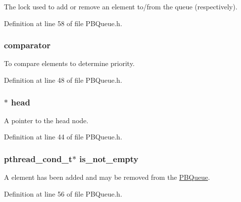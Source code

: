 The lock used to add or remove an element to/from the queue (respectively). 



Definition at line 58 of file P\+B\+Queue.\+h.

\hypertarget{struct_p_b_queue_a0e28f62bf96f811d42068f8d6b76cd47}{}
\subsubsection[{comparator}]{ comparator}\label{struct_p_b_queue_a0e28f62bf96f811d42068f8d6b76cd47}


To compare elements to determine priority. 



Definition at line 48 of file P\+B\+Queue.\+h.

\hypertarget{struct_p_b_queue_ab4aace72deb6ab6ac22137e740a3968b}{}
\subsubsection[{head}]{$\ast$ head}\label{struct_p_b_queue_ab4aace72deb6ab6ac22137e740a3968b}


A pointer to the head node. 



Definition at line 44 of file P\+B\+Queue.\+h.

\hypertarget{struct_p_b_queue_a2de5f9fe801e3f825c62cbad497ac623}{}
\subsubsection[{is\+\_\+not\+\_\+empty}]{\setlength{\rightskip}{0pt plus 5cm}pthread\+\_\+cond\+\_\+t$\ast$ is\+\_\+not\+\_\+empty}\label{struct_p_b_queue_a2de5f9fe801e3f825c62cbad497ac623}


A element has been added and may be removed from the \hyperlink{struct_p_b_queue}{P\+B\+Queue}. 



Definition at line 56 of file P\+B\+Queue.\+h.

